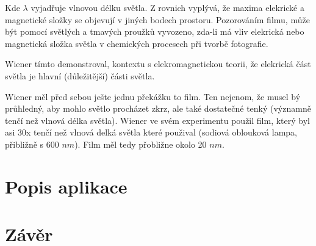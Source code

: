\documentclass[12pt,a4paper,titlepage,final]{report}
\begin{document}
Kde $\lambda$ vyjadřuje vlnovou délku světla. Z rovnich vyplývá, že
maxima elekrické a magnetické složky se objevují v jiných bodech prostoru. Pozorováním filmu, může být pomocí světlých a tmavých proužků vyvozeno, zda-li má vliv elekrická nebo magnetická složka světla v chemických procesech při tvorbě fotografie.

Wiener tímto demonstroval, kontextu s elekromagnetickou teorii, že elekrická část světla je hlavní (důležitější) části světla.

Wiener měl před sebou ješte jednu překážku to film. Ten nejenom, že musel bý průhledný, aby mohlo světlo procházet zkrz, ale také dostatečné tenký (významně tenčí než vlnová délka světla).
Wiener ve svém experimentu použil film, který byl asi 30x tenčí než 
vlnová delká světla které použival (sodiová oblouková lampa, přibližně s 600 $nm$). Film měl tedy přobližne okolo 20 $nm$.

\section{Popis aplikace}
\lipsum[40]

\section{Závěr}
\lipsum[50]
\lipsum[51]
\lipsum[52]

\textcolor{white}{
	\citep{klingmann_thesis}
	\cite{he}
	\cite{zhang}
	\cite{ann}
}




\end{document}
